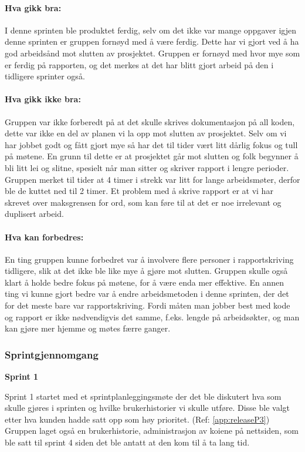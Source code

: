 \documentclass[12pt,a4paper,norsk]{article}
\begin{document}
\paragraph{Hva gikk bra:}
I denne sprinten ble produktet ferdig, selv om det ikke var mange oppgaver igjen denne sprinten er gruppen fornøyd med å være ferdig. Dette har vi gjort ved å ha god arbeidsånd mot slutten av prosjektet.
Gruppen er fornøyd med hvor mye som er ferdig på rapporten, og det merkes at det har blitt gjort arbeid på den i tidligere sprinter også.

\paragraph{Hva gikk ikke bra:}
Gruppen var ikke forberedt på at det skulle skrives dokumentasjon på all koden, dette var ikke en del av planen vi la opp mot slutten av prosjektet.
Selv om vi har jobbet godt og fått gjort mye så har det til tider vært litt dårlig fokus og tull på møtene. En grunn til dette er at prosjektet går mot slutten og folk begynner å bli litt lei og slitne, spesielt når man sitter og skriver rapport i lengre perioder. Gruppen merket til tider at 4 timer i strekk var litt for lange arbeidsmøter, derfor ble de kuttet ned til 2 timer.
Et problem med å skrive rapport er at vi har skrevet over maksgrensen for ord, som kan føre til at det er noe irrelevant og duplisert arbeid.

\paragraph{Hva kan forbedres:}
En ting gruppen kunne forbedret var å involvere flere personer i rapportskriving tidligere, slik at det ikke ble like mye å gjøre mot slutten.
Gruppen skulle også klart å holde bedre fokus på møtene, for å være enda mer effektive.
En annen ting vi kunne gjort bedre var å endre arbeidsmetoden i denne sprinten, der det for det meste bare var rapportskriving. Fordi måten man jobber best med kode og rapport er ikke nødvendigvis det samme, f.eks. lengde på arbeidsøkter, og man kan gjøre mer hjemme og møtes færre ganger.

\subsubsection{Sprintgjennomgang}
\bigskip \noindent \textbf{Sprint 1}
\par Sprint 1 startet med et sprintplanleggingsmøte der det ble diskutert hva som  skulle gjøres i sprinten og hvilke brukerhistorier vi skulle utføre. Disse ble valgt etter hva kunden hadde satt opp som høy prioritet. (Ref: \cref{app:releaseP3}) Gruppen laget også en brukerhistorie, administrasjon av koiene på nettsiden, som ble satt til sprint 4 siden det ble antatt at den kom til å ta lang tid.
\end{document}
